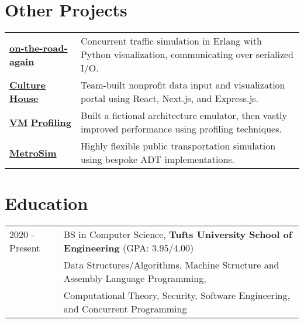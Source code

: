 \documentclass[letter,10pt]{article}
\begin{document}

\section{Other Projects}

\begin{tabularx}{\linewidth}{@{}l X@{}}
\href{https://github.com/liam-strand/cs-21-final-project}{\textbf{on-the-road-again}} & Concurrent traffic simulation in Erlang with Python visualization, communicating over serialized I/O. \\[3.75pt]
\href{}{\textbf{Culture House}} & Team-built nonprofit data input and visualization portal using React, Next.js, and Express.js. \\[3.75pt]
\href{https://github.com/liam-strand/hw6-um}{\textbf{VM}} \href{https://github.com/liam-strand/hw7-profiling}{\textbf{Profiling}} & Built a fictional architecture emulator, then vastly improved performance using profiling techniques. \\[3.75pt]
\href{}{\textbf{MetroSim}} & Highly flexible public transportation simulation using bespoke ADT implementations. \\[3.75pt]
\end{tabularx}

\section{Education}
\begin{tabularx}{\linewidth}{@{}l X@{}}	
2020 - Present & BS in Computer Science, \textbf{Tufts University School of Engineering} \hfill \normalsize (GPA: 3.95/4.00) \\
    & \footnotesize{Data Structures/Algorithms, Machine Structure and Assembly Language Programming,} \\
    & \footnotesize{Computational Theory, Security, Software Engineering, and Concurrent Programming}
\end{tabularx}

\end{document}

